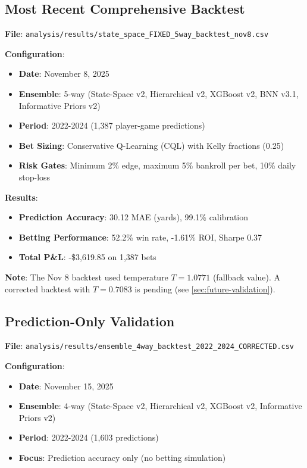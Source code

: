 \subsection{Most Recent Comprehensive Backtest}

\textbf{File}: \texttt{analysis/results/state\_space\_FIXED\_5way\_backtest\_nov8.csv}

\textbf{Configuration}:
\begin{itemize}
    \item \textbf{Date}: November 8, 2025
    \item \textbf{Ensemble}: 5-way (State-Space v2, Hierarchical v2, XGBoost v2, BNN v3.1, Informative Priors v2)
    \item \textbf{Period}: 2022-2024 (1,387 player-game predictions)
    \item \textbf{Bet Sizing}: Conservative Q-Learning (CQL) with Kelly fractions (0.25)
    \item \textbf{Risk Gates}: Minimum 2\% edge, maximum 5\% bankroll per bet, 10\% daily stop-loss
\end{itemize}

\textbf{Results}:
\begin{itemize}
    \item \textbf{Prediction Accuracy}: 30.12 MAE (yards), 99.1\% calibration
    \item \textbf{Betting Performance}: 52.2\% win rate, -1.61\% ROI, Sharpe 0.37
    \item \textbf{Total P\&L}: -\$3,619.85 on 1,387 bets
\end{itemize}

\textbf{Note}: The Nov 8 backtest used temperature $T=1.0771$ (fallback value). A corrected backtest with $T=0.7083$ is pending (see \autoref{sec:future-validation}).

\subsection{Prediction-Only Validation}

\textbf{File}: \texttt{analysis/results/ensemble\_4way\_backtest\_2022\_2024\_CORRECTED.csv}

\textbf{Configuration}:
\begin{itemize}
    \item \textbf{Date}: November 15, 2025
    \item \textbf{Ensemble}: 4-way (State-Space v2, Hierarchical v2, XGBoost v2, Informative Priors v2)
    \item \textbf{Period}: 2022-2024 (1,603 predictions)
    \item \textbf{Focus}: Prediction accuracy only (no betting simulation)
\end{itemize}

